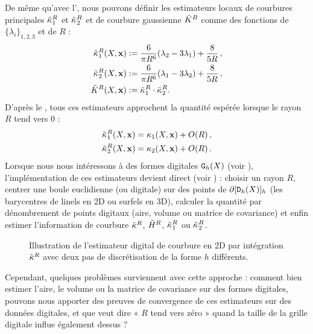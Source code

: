 %
De même qu'avec l', nous pouvons définir
les estimateurs locaux de courbures principales $\tilde{\kappa_{}}_{1}^{R}$ et
$\tilde{\kappa_{}}_{2}^{R}$ et de courbure gaussienne $\tilde{K}^{R}$ comme des
fonctions de $\{\lambda_i\}_{1,2,3}$ et de $R$ :
%
\begin{align}
  \label{eq:pottmann-3d-princ}
  \tilde{\kappa_{}}_{1}^{R}(X,\mathbf{x})& := \frac{6}{\pi R^6}(\lambda_2 - 3\lambda_1) + \frac{8}{5R}\,,\\
  \tilde{\kappa_{}}_{2}^{R}(X,\mathbf{x})& := \frac{6}{\pi R^6}(\lambda_1 - 3\lambda_2) + \frac{8}{5R}\,,\\
  \tilde{K}^{R}(X,\mathbf{x})& := \tilde{\kappa_{}}_{1}^{R} \cdot \tilde{\kappa_{}}_{2}^{R}.
\end{align}
%
D'après le , tous ces estimateurs approchent la
quantité espérée lorsque le rayon $R$ tend vers $0$ :
%
\begin{align}
  \label{eq:pottmann-3d-princ}
  \PrincCurvT{1}{R}(\Shape,\vx)& = \PrincCurv{1}(\Shape,\vx) + O(R)\,,\\
  \PrincCurvT{2}{R}(\Shape,\vx)& = \PrincCurv{2}(\Shape,\vx) + O(R)\,.%
\end{align}
%
Lorsque nous nous intéressons à des formes digitales $\mathtt{G}_{h}(X)$ (voir
), l'implémentation de ces estimateurs
devient direct (voir ) : choisir un rayon $R$,
centrer une boule euclidienne (ou digitale) sur des points de
$\partial \lbrack \mathtt{D}_{h}(X) \rbrack_{h}$ (\cad les barycentres de linels en 2D ou
surfels en 3D), calculer la quantité par dénombrement de points digitaux (aire, volume ou matrice de covariance) et
enfin estimer l'information de courbure $\tilde{\kappa}^{R}$, $\tilde{H}^{R}$,
$\tilde{\kappa_{}}_{1}^{R}$ ou $\tilde{\kappa_{}}_{2}^{R}$.

\begin{figure}[ht]
  \begin{center}
    
  \end{center}
  \caption[Illustration de l'estimateur digital de courbure en 2D par intégration
  $\CurvH{R}$.]{Illustration de l'estimateur digital de courbure en 2D par
  intégration $\CurvH{R}$ avec deux pas de discrétisation de la forme $h$
  différents.\label{fig:2d-curv-estimator}}
\end{figure}

Cependant, quelques problèmes surviennent avec cette approche : comment bien
estimer l'aire, le volume ou la matrice de covariance sur des formes digitales,
pouvons nous apporter des preuves de convergence de ces estimateurs sur des
données digitales, et que veut dire « $R$ tend vers zéro » quand la taille de la
grille digitale influe également dessus ?

